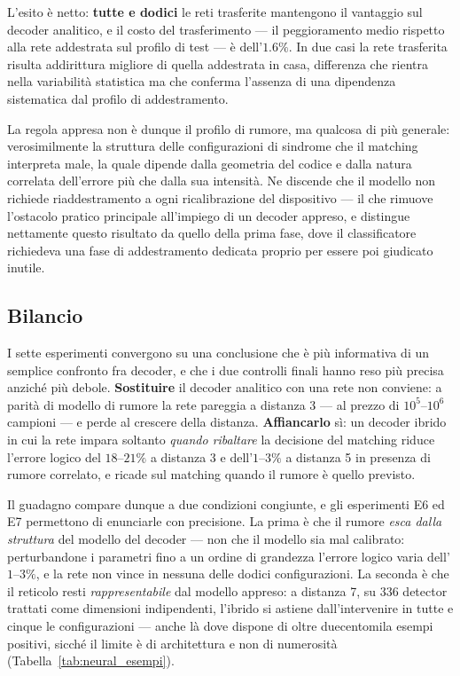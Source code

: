L'esito è netto: \textbf{tutte e dodici} le reti trasferite mantengono il vantaggio sul decoder analitico, e il costo del trasferimento --- il peggioramento medio rispetto alla rete addestrata sul profilo di test --- è dell'$1.6\%$. In due casi la rete trasferita risulta addirittura migliore di quella addestrata in casa, differenza che rientra nella variabilità statistica ma che conferma l'assenza di una dipendenza sistematica dal profilo di addestramento.

La regola appresa non è dunque il profilo di rumore, ma qualcosa di più generale: verosimilmente la struttura delle configurazioni di sindrome che il matching interpreta male, la quale dipende dalla geometria del codice e dalla natura correlata dell'errore più che dalla sua intensità. Ne discende che il modello non richiede riaddestramento a ogni ricalibrazione del dispositivo --- il che rimuove l'ostacolo pratico principale all'impiego di un decoder appreso, e distingue nettamente questo risultato da quello della prima fase, dove il classificatore richiedeva una fase di addestramento dedicata proprio per essere poi giudicato inutile.

\subsection{Bilancio}
\label{subsec:neural_bilancio}

I sette esperimenti convergono su una conclusione che è più informativa di un semplice confronto fra decoder, e che i due controlli finali hanno reso più precisa anziché più debole. \textbf{Sostituire} il decoder analitico con una rete non conviene: a parità di modello di rumore la rete pareggia a distanza 3 --- al prezzo di $10^5$--$10^6$ campioni --- e perde al crescere della distanza. \textbf{Affiancarlo} sì: un decoder ibrido in cui la rete impara soltanto \emph{quando ribaltare} la decisione del matching riduce l'errore logico del $18$--$21\%$ a distanza 3 e dell'$1$--$3\%$ a distanza 5 in presenza di rumore correlato, e ricade sul matching quando il rumore è quello previsto.

Il guadagno compare dunque a due condizioni congiunte, e gli esperimenti E6 ed E7 permettono di enunciarle con precisione. La prima è che il rumore \emph{esca dalla struttura} del modello del decoder --- non che il modello sia mal calibrato: perturbandone i parametri fino a un ordine di grandezza l'errore logico varia dell'$1$--$3\%$, e la rete non vince in nessuna delle dodici configurazioni. La seconda è che il reticolo resti \emph{rappresentabile} dal modello appreso: a distanza 7, su $336$ detector trattati come dimensioni indipendenti, l'ibrido si astiene dall'intervenire in tutte e cinque le configurazioni --- anche là dove dispone di oltre duecentomila esempi positivi, sicché il limite è di architettura e non di numerosità (Tabella~\ref{tab:neural_esempi}).

